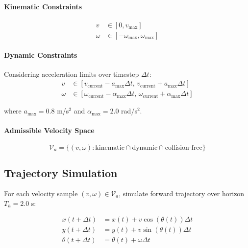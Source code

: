 \paragraph{Kinematic Constraints}
\begin{equation}
\begin{aligned}
v &\in [0, v_{\max}] \\
\omega &\in [-\omega_{\max}, \omega_{\max}]
\end{aligned}
\label{eq:kinematic_constraints}
\end{equation}

\paragraph{Dynamic Constraints}
Considering acceleration limits over timestep $\Delta t$:
\begin{equation}
\begin{aligned}
v &\in [v_{\text{current}} - a_{\max} \Delta t, \, v_{\text{current}} + a_{\max} \Delta t] \\
\omega &\in [\omega_{\text{current}} - \alpha_{\max} \Delta t, \, \omega_{\text{current}} + \alpha_{\max} \Delta t]
\end{aligned}
\label{eq:dynamic_constraints}
\end{equation}

where $a_{\max} = 0.8$ m/s$^2$ and $\alpha_{\max} = 2.0$ rad/s$^2$.

\paragraph{Admissible Velocity Space}
\begin{equation}
\mathcal{V}_a = \{(v, \omega) : \text{kinematic} \cap \text{dynamic} \cap \text{collision-free}\}
\label{eq:admissible_space}
\end{equation}

\subsection{Trajectory Simulation}

For each velocity sample $(v, \omega) \in \mathcal{V}_a$, simulate forward trajectory over horizon $T_h = 2.0$ s:

\begin{equation}
\begin{aligned}
x(t + \Delta t) &= x(t) + v \cos(\theta(t)) \Delta t \\
y(t + \Delta t) &= y(t) + v \sin(\theta(t)) \Delta t \\
\theta(t + \Delta t) &= \theta(t) + \omega \Delta t
\end{aligned}
\label{eq:trajectory_simulation}
\end{equation}

